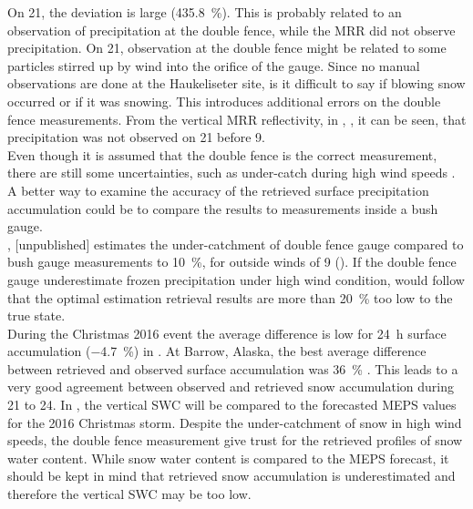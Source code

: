 \par\medskip
On \SI{21}{\dec}, the deviation is large (\SI{435.8}{\percent}). This is probably related to an observation of precipitation at the double fence, while the MRR did not observe precipitation.
On \SI{21}{\dec}, observation at the double fence might be related to some particles stirred up by wind into the orifice of the gauge. Since no manual observations are done at the Haukeliseter site, is it difficult to say if blowing snow occurred or if it was snowing. This introduces additional errors on the double fence measurements. From the vertical MRR reflectivity, in , , it can be seen, that precipitation was not observed on \SI{21}{\dec} before \SI{9}{\UTC}.
\\
Even though it is assumed that the double fence is the correct measurement, there are still some uncertainties, such as under-catch during high wind speeds \citep[][unpublished]{wolff_wmo_2018}. 
A better way to examine the accuracy of the retrieved surface precipitation accumulation could be to compare the results to measurements inside a bush gauge. 
\\
\citet{wolff_wmo_2018}, [unpublished] estimates the under-catchment of double fence gauge compared to bush gauge measurements to \SI{10}{\percent}, for outside winds of \SI{9}{\mPs} ().
If the double fence gauge underestimate frozen precipitation under high wind condition, would follow that the optimal estimation retrieval results are more than \SI{20}{\percent} too low to the true state. 
\\
During the Christmas 2016 event the average difference is low for \SI{24}{\hour} surface accumulation (\SI{-4.7}{\percent}) in . At Barrow, Alaska, the best average difference between retrieved and observed surface accumulation was \SI{36}{\percent} \citep{cooper_variational_2017}.
This leads to a very good agreement between observed and retrieved snow accumulation during \num{21} to \SI{24}{\dec}. 
In , the vertical SWC will be compared to the forecasted MEPS values for the 2016 Christmas storm. Despite the under-catchment of snow in high wind speeds, the double fence measurement give trust for the retrieved profiles of snow water content. While snow water content is compared to the MEPS forecast, it should be kept in mind that retrieved snow accumulation is underestimated and therefore the vertical SWC may be too low.




